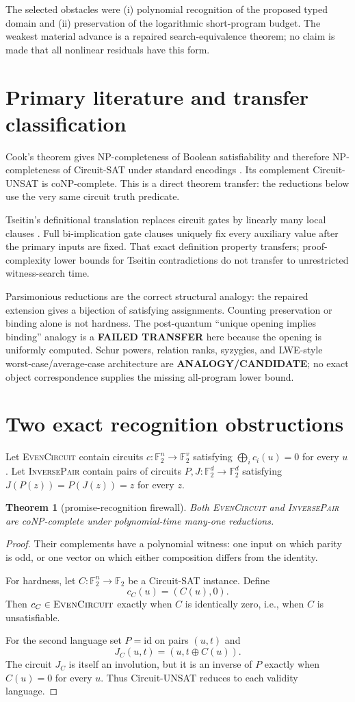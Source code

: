 \documentclass[11pt]{article}
\newtheorem{theorem}{Theorem}
\newcommand{\F}{\mathbb F_2}
\begin{document}
The selected obstacles were (i) polynomial recognition of the proposed typed
domain and (ii) preservation of the logarithmic short-program budget.  The
weakest material advance is a repaired search-equivalence theorem; no claim is
made that all nonlinear residuals have this form.

\section{Primary literature and transfer classification}
Cook's theorem gives NP-completeness of Boolean satisfiability and therefore
NP-completeness of Circuit-SAT under standard encodings \cite{Cook}.  Its
complement Circuit-UNSAT is coNP-complete.  This is a direct theorem transfer:
the reductions below use the very same circuit truth predicate.

Tseitin's definitional translation replaces circuit gates by linearly many
local clauses \cite{Tseitin}.  Full bi-implication gate clauses uniquely fix
every auxiliary value after the primary inputs are fixed.  That exact
definition property transfers; proof-complexity lower bounds for Tseitin
contradictions do not transfer to unrestricted witness-search time.

Parsimonious reductions are the correct structural analogy: the repaired
extension gives a bijection of satisfying assignments.  Counting preservation
or binding alone is not hardness.  The post-quantum ``unique opening implies
binding'' analogy is a \textbf{FAILED TRANSFER} here because the opening is
uniformly computed.  Schur powers, relation ranks, syzygies, and LWE-style
worst-case/average-case architecture are \textbf{ANALOGY/CANDIDATE}; no exact
object correspondence supplies the missing all-program lower bound.

\section{Two exact recognition obstructions}
Let \textsc{EvenCircuit} contain circuits $c:\F^n\to\F^v$ satisfying
$\bigoplus_i c_i(u)=0$ for every $u$.  Let \textsc{InversePair} contain pairs
of circuits $P,J:\F^d\to\F^d$ satisfying
$J(P(z))=P(J(z))=z$ for every $z$.

\begin{theorem}[promise-recognition firewall]
Both \textsc{EvenCircuit} and \textsc{InversePair} are coNP-complete under
polynomial-time many-one reductions.
\end{theorem}
\begin{proof}
Their complements have a polynomial witness: one input on which parity is odd,
or one vector on which either composition differs from the identity.

For hardness, let $C:\F^n\to\F$ be a Circuit-SAT instance.  Define
\[
 c_C(u)=(C(u),0).
\]
Then $c_C\in\textsc{EvenCircuit}$ exactly when $C$ is identically zero, i.e.,
when $C$ is unsatisfiable.

For the second language set $P=\mathrm{id}$ on pairs $(u,t)$ and
\[
 J_C(u,t)=(u,t\oplus C(u)).
\]
The circuit $J_C$ is itself an involution, but it is an inverse of $P$ exactly
when $C(u)=0$ for every $u$.  Thus Circuit-UNSAT reduces to each validity
language.
\end{proof}
\end{document}
